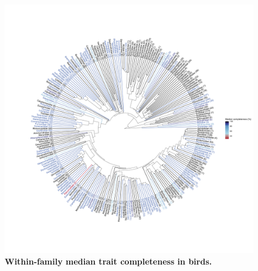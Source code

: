 \begin{landscape}
\begin{figure}[h!]
\centering
\includegraphics[scale=0.5,clip, trim=100 100 0 160]{Supporting/Chapter2/Figures/Phylogenies/Circular_birds_V2}
\caption[Within-family median trait completeness in birds]{\textbf{Within-family median trait completeness in birds.}}
\label{}
\end{figure}

\end{landscape}


\newpage
\pagebreak

